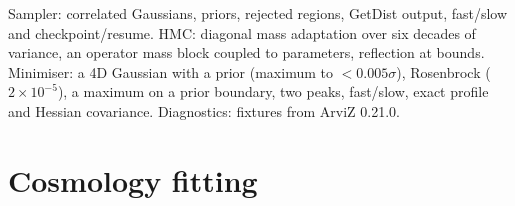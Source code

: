\begin{validation}
Sampler: correlated Gaussians, priors, rejected regions, GetDist output, fast/slow and checkpoint/resume. HMC: diagonal mass adaptation over six decades of
variance, an operator mass block coupled to parameters, reflection at bounds. Minimiser: a 4D Gaussian with a prior (maximum to $<0.005\sigma$), Rosenbrock
($2\times10^{-5}$), a maximum on a prior boundary, two peaks, fast/slow, exact profile and Hessian covariance. Diagnostics: fixtures from ArviZ 0.21.0.
\end{validation}

\section{Cosmology fitting}\label{sec:fit-cosmology}

